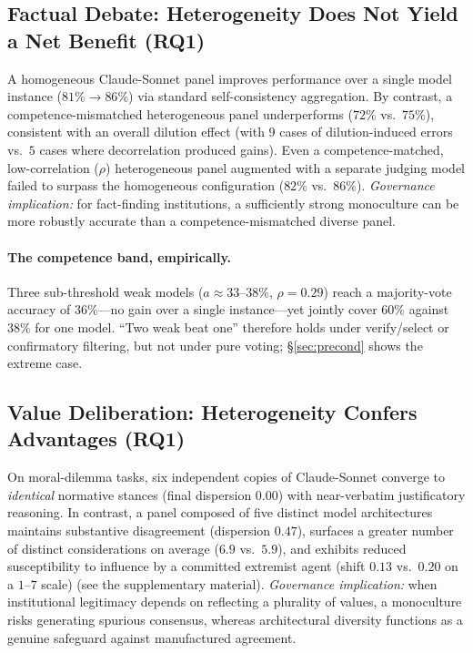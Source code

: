 \documentclass[manuscript,screen,review]{acmart}
\begin{document}
\subsection{Factual Debate: Heterogeneity Does Not Yield a Net Benefit (RQ1)}
A homogeneous Claude-Sonnet panel improves performance over a single model instance ($81\%\!\to\!86\%$) via standard self-consistency aggregation. By contrast, a competence-mismatched heterogeneous panel underperforms ($72\%$ vs.\ $75\%$), consistent with an overall dilution effect (with $9$ cases of dilution-induced errors vs.\ $5$ cases where decorrelation produced gains). Even a competence-matched, low-correlation ($\rho$) heterogeneous panel augmented with a separate judging model failed to surpass the homogeneous configuration ($82\%$ vs.\ $86\%$). \emph{Governance implication:} for fact-finding institutions, a sufficiently strong monoculture can be more robustly accurate than a competence-mismatched diverse panel.

\paragraph{The competence band, empirically.} Three sub-threshold weak models
($a\approx33$--$38\%$, $\rho=0.29$) reach a majority-vote accuracy of $36\%$---no
gain over a single instance---yet jointly cover $60\%$ against $38\%$ for one model.
``Two weak beat one'' therefore holds under verify/select or confirmatory
filtering, but not under pure voting; \S\ref{sec:precond} shows the extreme case.

\subsection{Value Deliberation: Heterogeneity Confers Advantages (RQ1)}
\label{sec:delib}
On moral-dilemma tasks, six independent copies of Claude-Sonnet converge to \emph{identical} normative stances (final dispersion $0.00$) with near-verbatim justificatory reasoning. In contrast, a panel composed of five distinct model architectures maintains substantive disagreement (dispersion $0.47$), surfaces a greater number of distinct considerations on average ($6.9$ vs.\ $5.9$), and exhibits reduced susceptibility to influence by a committed extremist agent (shift $0.13$ vs.\ $0.20$ on a $1$--$7$ scale) (see the supplementary material). \emph{Governance implication:} when institutional legitimacy depends on reflecting a plurality of values, a monoculture risks generating spurious consensus, whereas architectural diversity functions as a genuine safeguard against manufactured agreement.
\end{document}
